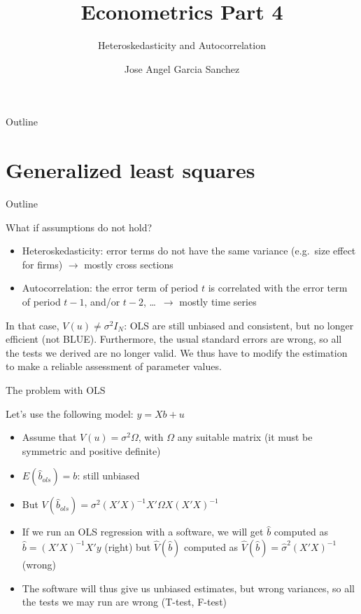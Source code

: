 \documentclass[aspectratio=169]{beamer}
\title{Econometrics Part 4}
\subtitle{Heteroskedasticity and Autocorrelation}
\author{Jose Angel Garcia Sanchez}
\institute{Sorbonne Data Analytics}
\date{} %
\begin{document}
{
\begin{frame}
\titlepage
\end{frame}
}

\begin{frame}{Outline}
\tableofcontents
\end{frame}

\section{Generalized least squares}

\begin{frame}{Outline}
\tableofcontents[currentsection]
\end{frame}

\begin{frame}{What if assumptions do not hold?}

\begin{itemize}
    \item Heteroskedasticity: error terms do not have the same variance (e.g.\ size effect for firms) $\rightarrow$ mostly cross sections
    \item Autocorrelation: the error term of period $t$ is correlated with the error term of period $t-1$, and/or $t-2$, \dots\ $\rightarrow$ mostly time series
\end{itemize}

In that case, $V(u) \neq \sigma^2 I_N$: OLS are still unbiased and consistent, but no longer efficient (not BLUE). Furthermore, the usual standard errors are wrong, so all the tests we derived are no longer valid. We thus have to modify the estimation to make a reliable assessment of parameter values.

\end{frame}

\begin{frame}{The problem with OLS}

Let's use the following model: $y = Xb + u$

\begin{itemize}
    \item Assume that $V(u) = \sigma^2\Omega$, with $\Omega$ any suitable matrix (it must be symmetric and positive definite)
    \item $E(\hat{b}_{ols}) = b$: still unbiased
    \item But $V(\hat{b}_{ols}) = \sigma^2(X'X)^{-1}X'\Omega X(X'X)^{-1}$
    \item If we run an OLS regression with a software, we will get $\hat{b}$ computed as $\hat{b} = (X'X)^{-1}X'y$ (right) but $\hat{V}(\hat{b})$ computed as $\hat{V}(\hat{b}) = \hat{\sigma}^2(X'X)^{-1}$ (wrong)
    \item The software will thus give us unbiased estimates, but wrong variances, so all the tests we may run are wrong (T-test, F-test)
\end{itemize}

\end{frame}
\end{document}
